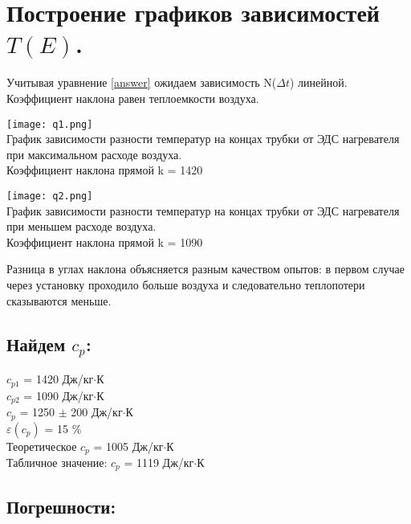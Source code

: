 \documentclass[a4paper,17pt]{article}
\begin{document}
\newpage
\section{Построение графиков зависимостей $T(E)$.}
    Учитывая уравнение \ref{answer} ожидаем зависимость N($\Delta t$) линейной. Коэффициент наклона равен теплоемкости воздуха.
    \begin{center}
        \texttt{[image: q1.png]}\\
        График зависимости разности температур на концах трубки от ЭДС нагревателя при максимальном расходе воздуха.\\
        Коэффициент наклона прямой k = 1420
    \end{center}
    
    \begin{center}
        \texttt{[image: q2.png]}\\
        График зависимости разности температур на концах трубки от ЭДС нагревателя при меньшем расходе воздуха.\\
        Коэффициент наклона прямой k = 1090
    \end{center}
    Разница в углах наклона объясняется разным качеством опытов: в первом случае через установку проходило больше воздуха и следовательно теплопотери сказываются меньше.
    \subsection{Найдем $c_p$:}
    
        \begin{center}
            $c_{p1}$ = 1420 Дж/кг$\cdot$К                   \\ 
            $c_{p2}$ = 1090 Дж/кг$\cdot$К                   \\
            $c_{p}$ = 1250 $\pm$ 200 Дж/кг$\cdot$К          \\
            $\varepsilon(c_p)$ =  15 \%                     \\
            Теоретическое $c_{p}$ = 1005 Дж/кг$\cdot$К      \\
            Табличное значение: $c_{p}$ = 1119 Дж/кг$\cdot$К\\
        \end{center}
        
    \subsection{Погрешности:}
    
\end{document}
